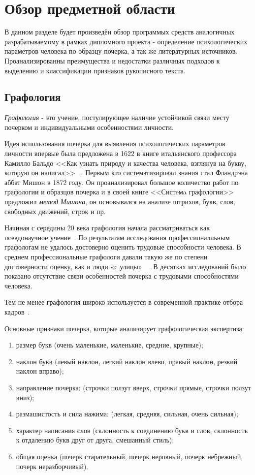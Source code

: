 \section{Обзор предметной области}
\label{sec:domain:intro}

В данном разделе будет произведён обзор программых средств аналогичных разрабатываемому в рамках дипломного проекта - определение психологических параметров человека по образцу почерка, а так же литературных источников. Проанализированны преимущества и недостатки различных подходов к выделению и классификации признаков рукописного текста.

\subsection{Графология}
\label{sub:domain:grafologic}
\emph{Графология} - это учение, постулирующее наличие устойчивой связи месту почерком и индивидуальными особенностями личности.

Идея использования почерка для выявления психологических параметров личности впервые была предложена в 1622 в книге итальянского профессора Камилло Бальдо <<Как узнать природу и качества человека, взглянув на букву, которую он написал>> ~\cite{kamillo_grafology}. Первым кто систематизировал знания стал Фландрэна аббат Мишон в 1872 году. Он проанализировал большое количество работ по графологии и образцов почерка и в своей книге <<Систeмa графологии>> предложил \emph{метод Мишона}, он основывался на анализе штрихов, букв, слов, свободных движений, строк и пр.~\cite{mishon_grafology}

Начиная с середины 20 века графология начала рассматриваться как псевдонаучное учение~\cite{graphology_wiki}. По результатам исследования профессионалльным графологам не удалось достоверно оценить трудовые способности человека. В среднем профессиональные графологи давали такую же по степени достоверности оценку, как и люди «с улицы»~\cite{neter_shakhar_psevdograph}~\cite{king_koehler_psevdograph}. В десятках исследований было показано отсутствие связи особенностей почерка с трудовыми способностями человека.

Тем не менее графология широко используется в современной практике отбора кадров~\cite{graphology_psyfactor}.

Основные признаки почерка, которые анализирует графологическая экспертиза:
\begin{enumerate}
  \item размер букв (очень маленькие, маленькие, средние, крупные);
  \item наклон букв (левый наклон, легкий наклон влево, правый наклон, резкий наклон вправо);
  \item направление почерка: (строчки ползут вверх, строчки прямые,  строчки ползут вниз);
  \item размашистость и сила нажима: (легкая, средняя, сильная, очень сильная);
  \item характер написания слов (склонность к соединению букв и слов, склонность к отдалению букв друг от друга, смешанный стиль);
  \item общая оценка (почерк старательный, почерк неровный, почерк небрежный, почерк неразборчивый).
\end{enumerate}

